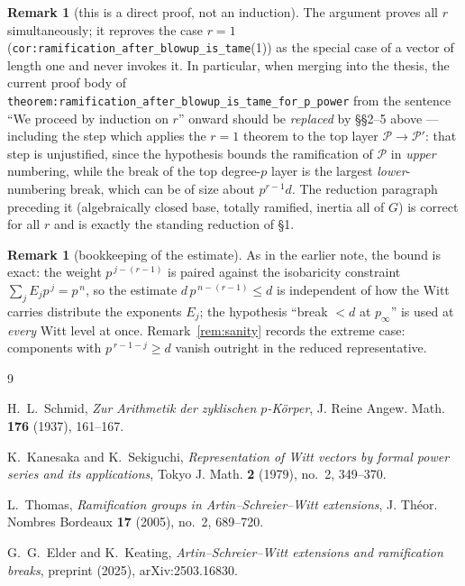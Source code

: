 \documentclass[11pt]{article}
\newcommand{\cP}{\mathcal{P}}
\theoremstyle{plain}
\theoremstyle{definition}
\newtheorem{remark}[theorem]{Remark}
\begin{document}
\begin{remark}[this is a direct proof, not an induction]\label{rem:direct}
The argument proves all $r$ simultaneously; it reproves the case $r=1$
(\texttt{cor:ramification\_after\_blowup\_is\_tame}(1)) as the special case of a vector
of length one and never invokes it. In particular, when merging into the thesis, the
current proof body of
\texttt{theorem:ramification\_after\_blowup\_is\_tame\_for\_p\_power} from the sentence
``We proceed by induction on $r$'' onward should be \emph{replaced} by
\S\S2--5 above --- including the step which applies the $r=1$ theorem to the top layer
$\cP\to\cP'$: that step is unjustified, since the hypothesis bounds the ramification of
$\cP$ in \emph{upper} numbering, while the break of the top degree-$p$ layer is the
largest \emph{lower}-numbering break, which can be of size about $p^{r-1}d$. The
reduction paragraph preceding it (algebraically closed base, totally ramified, inertia
all of $G$) is correct for all $r$ and is exactly the standing reduction of \S1.
\end{remark}

\begin{remark}[bookkeeping of the estimate]
As in the earlier note, the bound is exact: the weight $p^{\,j-(r-1)}$ is paired against
the isobaricity constraint $\sum_jE_jp^{\,j}=p^{\,n}$, so the estimate
$d\,p^{\,n-(r-1)}\le d$ is independent of how the Witt carries distribute the exponents
$E_j$; the hypothesis ``break $<d$ at $p_\infty$'' is used at \emph{every} Witt level at
once. Remark~\ref{rem:sanity} records the extreme case: components with
$p^{\,r-1-j}\ge d$ vanish outright in the reduced representative.
\end{remark}

\begin{thebibliography}{9}

H.~L.~Schmid,
\emph{Zur Arithmetik der zyklischen $p$-K\"orper},
J. Reine Angew. Math. \textbf{176} (1937), 161--167.

K.~Kanesaka and K.~Sekiguchi,
\emph{Representation of Witt vectors by formal power series and its applications},
Tokyo J. Math. \textbf{2} (1979), no.~2, 349--370.

L.~Thomas,
\emph{Ramification groups in Artin--Schreier--Witt extensions},
J. Th\'eor. Nombres Bordeaux \textbf{17} (2005), no.~2, 689--720.

G.~G.~Elder and K.~Keating,
\emph{Artin--Schreier--Witt extensions and ramification breaks},
preprint (2025), arXiv:2503.16830.

\end{thebibliography}
\end{document}
